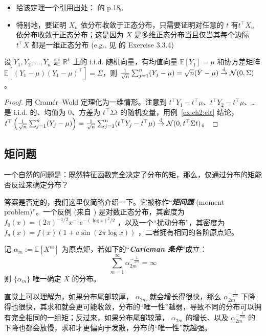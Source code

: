 \begin{remark}

\begin{itemize}
\tightlist
\item
  给该定理一个引用出处：\cite{serfling1980} 的 p.18。
\item
  特别地，要证明 $X_n$ 依分布收敛于正态分布，只需要证明对任意的 $t$ 有$t^\top X_n$ 依分布收敛于正态分布；这是因为 $X$ 是多维正态分布当且仅当其每个边际 $t^\top X$ 都是一维正态分布 (e.g., 见 \cite{vershynin2018} 的 Exercise 3.3.4)
\end{itemize}
\end{remark}

\begin{example}[高维中心极限定理]
设 $Y_1,Y_2,\dots,Y_n$ 是 $\mathbb R^k$ 上的 i.i.d. 随机向量，有均值向量 $\mathbb{E}[Y_1]=\mu$ 和协方差矩阵 $\mathbb{E}[(Y_1-\mu)(Y_1-\mu)^\top]=\Sigma$，则 $\frac1{\sqrt n}\sum_{j=1}^n(Y_j-\mu)=\sqrt n(\bar Y-\mu)\overset{\rm d}\to \mathcal{N}(0,\Sigma)$。

\begin{proof}
用 Cramér--Wold 定理化为一维情形。注意到 $t^\top Y_1-t^\top \mu$、$t^\top Y_2-t^\top \mu$、\ldots{} 是 i.i.d. 的、均值为 0、方差为 $t^\top\Sigma t$ 的随机变量，用例~\ref{ex:ch2:clt} 结论，$t^\top\left(\frac1{\sqrt n}\sum_{j=1}^n(Y_j-\mu)\right)=\frac1{\sqrt n}\sum_{j=1}^n(t^\top Y_j-t^\top \mu)\overset{\rm d}\to \mathcal{N}(0,t^\top\Sigma t)$。
\end{proof}

\end{example}

\subsection{矩问题}

一个自然的问题是：既然特征函数完全决定了分布的矩，那么，仅通过分布的矩能否反过来确定分布？

答案是否定的，我们这里仅简略介绍一下。它被称作``\textbf{\emph{矩问题}} (moment problem)''。一个反例 (来自 \cite{heyde1963}) 是对数正态分布，其密度为 $f_0(x)=(2\pi)^{-1/2}x^{-1}e^{-(\log x)^2/2}$ ，以及一个``扰动分布''，其密度为 $f_a(x)=f(x)(1+a\sin(2\pi\log x))$ ，二者拥有相同的各阶原点矩。

记 $\alpha_m:=\mathbb{E}[X^m]$ 为原点矩，若如下的``\textbf{\emph{Carleman 条件}}''成立：\[ \sum_{m=1}^\infty \alpha_{2m}^{-\frac1{2m}}=\infty \]则 $\{\alpha_m\}$ 唯一确定 $X$ 的分布。

直觉上可以理解为，如果分布尾部较厚， $\alpha_{2m}$ 就会增长得很快，那么 $\alpha_{2m}^{-\frac1{2m}}$ 下降得也很快，其求和就会更可能收敛，分布的``唯一性''越弱，导致不同的分布可以拥有完全相同的一组矩；反过来，如果分布尾部较薄， $\alpha_{2m}$ 的增长、以及 $\alpha_{2m}^{-\frac1{2m}}$ 的下降也都会放慢，求和才更偏向于发散，分布的``唯一性''就越强。

